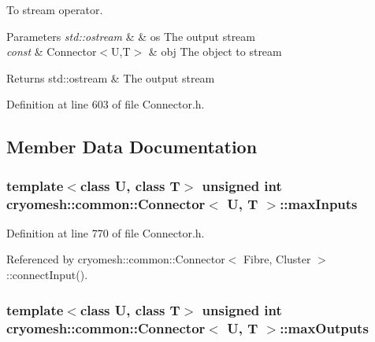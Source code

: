 \-To stream operator. 


\begin{DoxyParams}{\-Parameters}
{\em std\-::ostream} & \& os \-The output stream \\
\hline
{\em const} & \-Connector$<$\-U,\-T$>$ \& obj \-The object to stream\\
\hline
\end{DoxyParams}
\begin{DoxyReturn}{\-Returns}
std\-::ostream \& \-The output stream 
\end{DoxyReturn}


\-Definition at line 603 of file \-Connector.\-h.



\subsection{\-Member \-Data \-Documentation}
\hypertarget{classcryomesh_1_1common_1_1Connector_aed34a9f056b3f718cbf5669717d46694}{
\subsubsection[{max\-Inputs}]{\setlength{\rightskip}{0pt plus 5cm}template$<$class \-U, class \-T$>$ unsigned int {\bf cryomesh\-::common\-::\-Connector}$<$ \-U, \-T $>$\-::{\bf max\-Inputs}}}\label{classcryomesh_1_1common_1_1Connector_aed34a9f056b3f718cbf5669717d46694}


\-Definition at line 770 of file \-Connector.\-h.



\-Referenced by cryomesh\-::common\-::\-Connector$<$ Fibre, Cluster $>$\-::connect\-Input().

\hypertarget{classcryomesh_1_1common_1_1Connector_aa30303b7f79bab1364ff8ba53ea3fb25}{
\subsubsection[{max\-Outputs}]{\setlength{\rightskip}{0pt plus 5cm}template$<$class \-U, class \-T$>$ unsigned int {\bf cryomesh\-::common\-::\-Connector}$<$ \-U, \-T $>$\-::{\bf max\-Outputs}}}\label{classcryomesh_1_1common_1_1Connector_aa30303b7f79bab1364ff8ba53ea3fb25}


